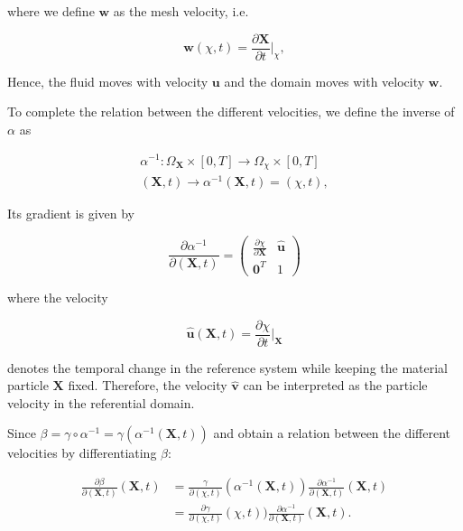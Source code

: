 \documentclass[a4paper,11pt,openright,twoside]{book}
\begin{document}
where we define $\mathbf{w}$ as the mesh velocity, i.e.

\begin{equation}
\mathbf{w}(\chi, t) = \frac{\partial \mathbf{X}}{\partial t} {\Big |}_\chi,
\end{equation}

Hence, the fluid moves with velocity $\mathbf{u}$ and the domain moves with velocity $\mathbf{w}$.

To complete the relation between the different velocities, we define the inverse of $\alpha$ as

\begin{align*}
\alpha^{-1} : \Omega_{\mathbf{X}} \times [0, T]  \rightarrow \Omega_\chi \times [0, T] \\
(\mathbf{X} , t)  \rightarrow \alpha^{-1}(\mathbf{X}, t) = (\chi, t),
\end{align*}


Its gradient is given by

\begin{equation}
\frac{\partial \alpha^{-1}}{\partial(\mathbf{X}, t)} = 
\begin{pmatrix}
\frac{\partial \chi}{\partial \mathbf{X}} & \hat{\mathbf{u}}\\
\mathbf{0}^T & 1
\end{pmatrix}
\end{equation}

where the velocity

\begin{equation}
\label{eq:ale:4}
\hat{\mathbf{u}} (\mathbf{X},t) = \frac{\partial \chi}{\partial t} {\Big |}_{\mathbf{X}}
\end{equation}

denotes the temporal change in the reference system while keeping the material particle $\mathbf{X}$ fixed. Therefore, the velocity $\mathbf{\hat{v}}$ can be interpreted as the particle velocity in the referential domain.

Since $\beta = \gamma \circ \alpha^{-1} = \gamma(\alpha^{-1}(\mathbf{X},t))$ and obtain a relation between the different velocities by differentiating $\beta$:

\begin{align*}
\frac{\partial \beta}{\partial (\mathbf{X},t)} (\mathbf{X},t)
& = \frac{\gamma}{\partial (\chi, t)}(\alpha^{-1}(\mathbf{X},t)) \frac{\partial \alpha^{-1}}{\partial(\mathbf{X},t)}(\mathbf{X},t) \\
& = \frac{\partial \gamma}{\partial (\chi, t)}(\chi,t)) \frac{\partial \alpha^{-1}}{\partial(\mathbf{X},t)}(\mathbf{X},t).
\end{align*}
\end{document}
